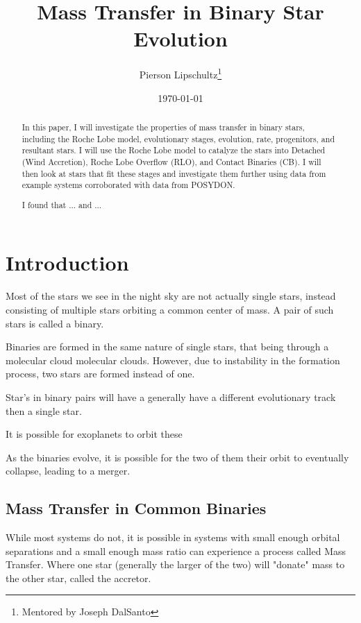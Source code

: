 \documentclass[12pt, letterpaper]{article}
\title{Mass Transfer in Binary Star Evolution}
\author{Pierson Lipschultz\thanks{Mentored by Joseph DalSanto}}
\date{\today}
\begin{document}
\maketitle
\begin{abstract}
    \normalsize
    In this paper, I will investigate the properties of mass transfer in binary stars, including the Roche Lobe model, evolutionary stages, evolution, rate, progenitors, and resultant stars. I will use the Roche Lobe model to catalyze the stars into Detached (Wind Accretion), Roche Lobe Overflow (RLO), and Contact Binaries (CB). I will then look at stars that fit these stages and investigate them further using data from example systems corroborated with data from POSYDON.

    I found that ... and ...
\end{abstract}

\pagebreak

\section{\centering Introduction} %

    Most of the stars we see in the night sky are not actually single stars, instead consisting of multiple stars orbiting a common center of mass. A pair of such stars is called a binary. 
    
    Binaries are formed in the same nature of single stars, that being through a molecular cloud molecular clouds. However, due to instability in the formation process, two stars are formed instead of one. \cite{Offner_2016}

    Star's in binary pairs will have a generally have a different evolutionary track then a single star.

    It is possible for exoplanets to orbit these 

    As the binaries evolve, it is possible for the two of them their orbit to eventually collapse, leading to a merger.
    

    \subsection{Mass Transfer in Common Binaries}
    While most systems do not, it is possible in systems with small enough orbital separations and a small enough mass ratio can experience a process called Mass Transfer. Where one star (generally the larger of the two) will "donate" mass to the other star, called the accretor.
\end{document}
